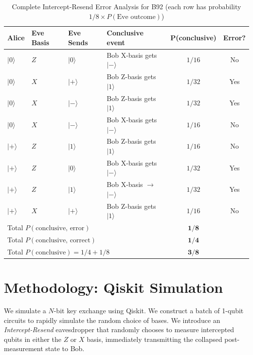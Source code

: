 \documentclass[conference]{IEEEtran}
\begin{document}
\begin{table}[htbp]
\caption{Complete Intercept-Resend Error Analysis for B92 (each row has probability $1/8 \times P(\text{Eve outcome})$)}
\label{tab:eve_scenarios}
\centering
\small
\begin{tabular}{llllcc}
\toprule
\textbf{Alice} & \textbf{Eve Basis} & \textbf{Eve Sends} & \textbf{Conclusive event} & \textbf{P(conclusive)} & \textbf{Error?} \\
\midrule
$|0\rangle$ & $Z$ & $|0\rangle$ & Bob X-basis gets $|-\rangle$ & $1/16$ & No \\
$|0\rangle$ & $X$ & $|+\rangle$ & Bob Z-basis gets $|1\rangle$ & $1/32$ & Yes \\
$|0\rangle$ & $X$ & $|-\rangle$ & Bob Z-basis gets $|1\rangle$ & $1/32$ & Yes \\
$|0\rangle$ & $X$ & $|-\rangle$ & Bob X-basis gets $|-\rangle$ & $1/16$ & No \\
$|+\rangle$ & $Z$ & $|1\rangle$ & Bob Z-basis gets $|1\rangle$ & $1/16$ & No \\
$|+\rangle$ & $Z$ & $|0\rangle$ & Bob X-basis gets $|-\rangle$ & $1/32$ & Yes \\
$|+\rangle$ & $Z$ & $|1\rangle$ & Bob X-basis $\to$ $|-\rangle$ & $1/32$ & Yes \\
$|+\rangle$ & $X$ & $|+\rangle$ & Bob Z-basis gets $|1\rangle$ & $1/16$ & No \\
\midrule
\multicolumn{4}{l}{Total $P(\text{conclusive, error})$} & $\mathbf{1/8}$ & \\
\multicolumn{4}{l}{Total $P(\text{conclusive, correct})$} & $\mathbf{1/4}$ & \\
\multicolumn{4}{l}{Total $P(\text{conclusive}) = 1/4 + 1/8$} & $\mathbf{3/8}$ & \\
\bottomrule
\end{tabular}
\end{table}

\section{Methodology: Qiskit Simulation}\label{sec:method}
We simulate a $N$-bit key exchange using Qiskit. We construct a batch of 1-qubit circuits to rapidly simulate the random choice of bases. We introduce an \textit{Intercept-Resend} eavesdropper that randomly chooses to measure intercepted qubits in either the $Z$ or $X$ basis, immediately transmitting the collapsed post-measurement state to Bob. 
\end{document}
